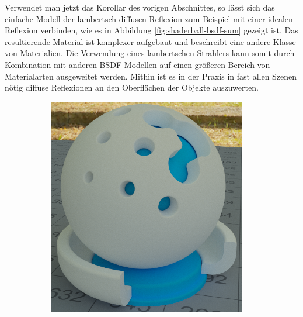 		Verwendet man jetzt das Korollar des vorigen Abschnittes, so lässt sich das einfache Modell der lambertsch diffusen Reflexion zum Beispiel mit einer idealen Reflexion verbinden, wie es in Abbildung \ref{fig:shaderball-bsdf-sum} gezeigt ist.
		Das resultierende Material ist komplexer aufgebaut und beschreibt eine andere Klasse von Materialien.
		Die Verwendung eines lambertschen Strahlers kann somit durch Kombination mit anderen BSDF-Modellen auf einen größeren Bereich von Materialarten ausgeweitet werden.
		Mithin ist es in der Praxis in fast allen Szenen nötig diffuse Reflexionen an den Oberflächen der Objekte auszuwerten.

		\begin{figure}[h]
			\begin{subfigure}[b]{0.5\textwidth}
				\center
				\includegraphics[width=0.95\textwidth]{pic/shaderball-bsdf_sum-diffuse.png}
			\end{subfigure}
			\begin{subfigure}[b]{0.5\textwidth}
				\center

\end{subfigure}
\end{figure}

